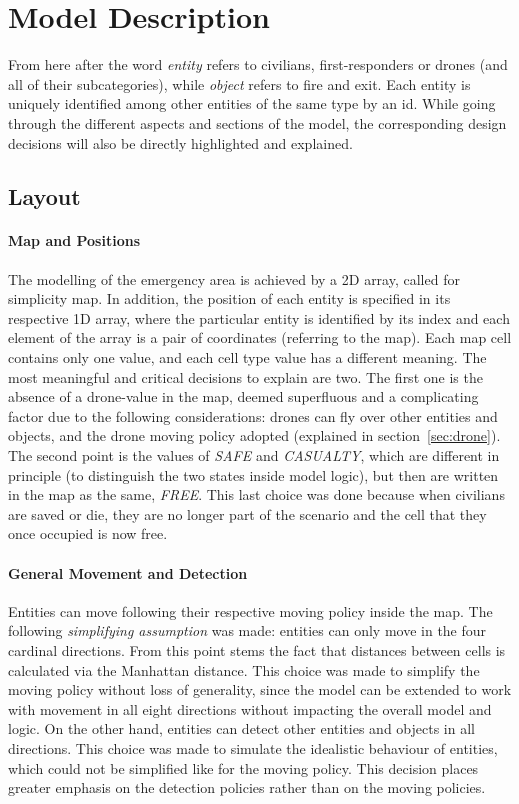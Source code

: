 
\section{Model Description}
From here after the word \textit{entity} refers to civilians, first-responders or drones (and all of their subcategories), while \textit{object} refers to fire and exit. Each entity is uniquely identified among other entities of the same type by an id. While going through the different aspects and sections of the model, the corresponding design decisions will also be directly highlighted and explained.


\subsection{Layout}
\paragraph{Map and Positions}
\label{sec:map}
The modelling of the emergency area is achieved by a 2D array, called for simplicity map. In addition, the position of each entity is specified in its respective 1D array, where the particular entity is identified by its index and each element of the array is a pair of coordinates (referring to the map).\newline
Each map cell contains only one value, and each cell type value has a different meaning. The most meaningful and critical decisions to explain are two. The first one is the absence of a drone-value in the map, deemed superfluous and a complicating factor due to the following considerations: drones can fly over other entities and objects, and the drone moving policy adopted (explained in section~\ref{sec:drone}). The second point is the values of \textit{SAFE} and \textit{CASUALTY}, which are different in principle (to distinguish the two states inside model logic), but then are written in the map as the same, \textit{FREE}. This last choice was done because when civilians are saved or die, they are no longer part of the scenario and the cell that they once occupied is now free.
\paragraph{General Movement and Detection}
Entities can move following their respective moving policy inside the map. The following \textit{simplifying assumption} was made: entities can only move in the four cardinal directions. From this point stems the fact that distances between cells is calculated via the Manhattan distance. This choice was made to simplify the moving policy without loss of generality, since the model can be extended to work with movement in all eight directions without impacting the overall model and logic. On the other hand, entities can detect other entities and objects in all directions. This choice was made to simulate the idealistic behaviour of entities, which could not be simplified like for the moving policy. This decision places greater emphasis on the detection policies rather than on the moving policies.


